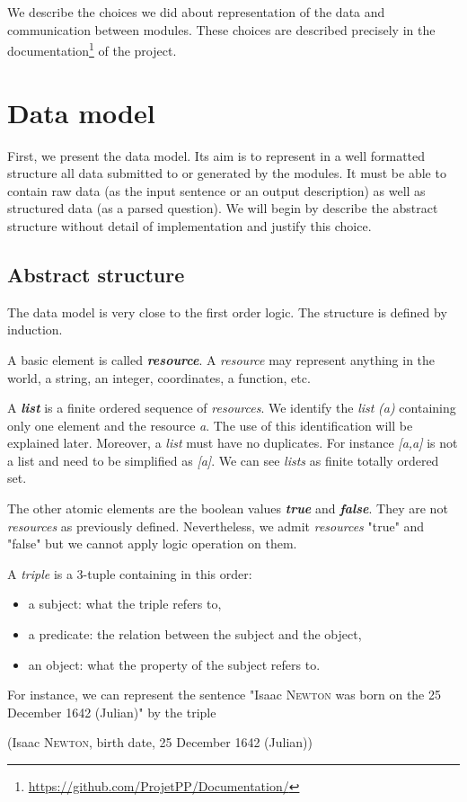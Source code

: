 We describe the choices we did about representation of the data and communication between modules.
These choices are described precisely in the documentation\footnote{\url{https://github.com/ProjetPP/Documentation/}} of the project.

\section{Data model}
\label{rdf}

First, we present the data model. Its aim is to represent in a well formatted structure all data submitted to or generated by the modules. It must be able to contain raw data (as the input sentence or an output description) as well as structured data (as a parsed question). We will begin by describe the abstract structure without detail of implementation and justify this choice.

\subsection{Abstract structure}

The data model is very close to the first order logic. The structure is defined by induction.

A basic element is called \textsl{\bf resource}. A \textsl{resource} may represent anything in the world, a string, an integer, coordinates, a function, etc.

A \textsl{\bf list} is a finite ordered sequence of \textsl{resources}. We identify the \textsl{list} \textsl{(a)} containing only one element and the resource \textsl{a}. The use of this identification will be explained later. Moreover, a \textsl{list} must have no duplicates. For instance \textsl{[a,a]} is not a list and need to be simplified as \textsl{[a]}. We can see \textsl{lists} as finite totally ordered set.

The other atomic elements are the boolean values \textsl{\bf true} and \textsl{\bf false}. They are not \textsl{resources} as previously defined. Nevertheless, we admit \textsl{resources} "true" and "false" but we cannot apply logic operation on them.

A \textsl{triple} is a 3-tuple containing in this order:
\begin{itemize}
    \item a subject: what the triple refers to,
    \item a predicate: the relation between the subject and the object,
    \item an object: what the property of the subject refers to.
\end{itemize}
For instance, we can represent the sentence "Isaac \textsc{Newton} was born on the 25 December 1642 (Julian)" by the triple \begin{center}(Isaac \textsc{Newton}, birth date, 25 December 1642 (Julian))\end{center}


